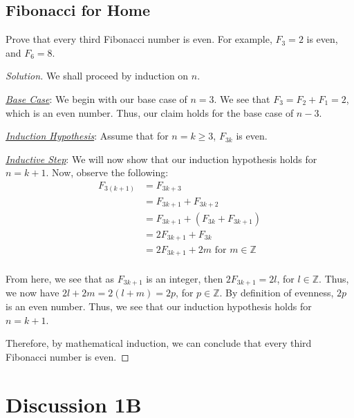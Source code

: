 \documentclass[openany]{book}
\newenvironment{solution}{\begin{proof}[Solution]}{\end{proof}}
\newcommand{\ZZ}{\mathbb{Z}}
\begin{document}
\section{Fibonacci for Home}
\begin{hw}
	Prove that every third Fibonacci number is even. For example, $F_{3}=2$ is even, and $F_{6}=8$.
\end{hw}
\begin{solution}
	We shall proceed by induction on $n$.
	
	\underline{\textit{Base Case}}: We begin with our base case of $n=3$. We see that $F_{3} = F_{2} + F_{1} = 2$, which is an even number. Thus, our claim holds for the base case of $n-3$.
	
	\underline{\textit{Induction Hypothesis}}: Assume that for $n=k \geq 3$, $F_{3k}$ is even.
	
	\underline{\textit{Inductive Step}}: We will now show that our induction hypothesis holds for $n=k+1$. Now, observe the following:
	\begin{align*}
		F_{3(k+1)} &= F_{3k+3} \\
		&= F_{3k+1} + F_{3k+2} \\
		&= F_{3k+1} + (F_{3k} + F_{3k+1}) \\
		&= 2F_{3k+1} + F_{3k} \\
		&= 2F_{3k+1} + 2m \text{ for $m \in \ZZ$}\tag{by our induction hypothesis} \\
	\end{align*}

	From here, we see that as $F_{3k+1}$ is an integer, then $2F_{3k+1} = 2l$, for $l \in \ZZ$. Thus, we now have $2l + 2m = 2(l+m) = 2p$, for $p \in \ZZ$. By definition of evenness, $2p$ is an even number. Thus, we see that our induction hypothesis holds for $n=k+1$.
	
	Therefore, by mathematical induction, we can conclude that every third Fibonacci number is even.
\end{solution}

\chapter{Discussion 1B}
\end{document}
